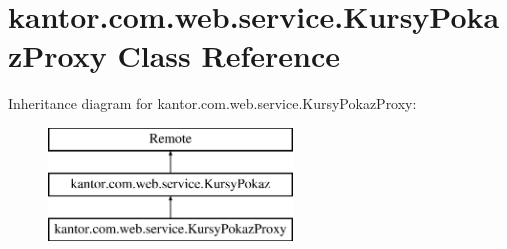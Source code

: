 \hypertarget{classkantor_1_1com_1_1web_1_1service_1_1_kursy_pokaz_proxy}{\section{kantor.\+com.\+web.\+service.\+Kursy\+Pokaz\+Proxy Class Reference}
\label{classkantor_1_1com_1_1web_1_1service_1_1_kursy_pokaz_proxy}
}
Inheritance diagram for kantor.\+com.\+web.\+service.\+Kursy\+Pokaz\+Proxy\+:\begin{figure}[H]
\begin{center}
\leavevmode
\includegraphics[height=3.000000cm]{classkantor_1_1com_1_1web_1_1service_1_1_kursy_pokaz_proxy}
\end{center}
\end{figure}
